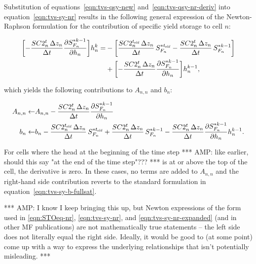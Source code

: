 \noindent Substitution of equations~\ref{eqn:tvs-qsy-new} and~\ref{eqn:tvs-qsy-nr-deriv} into equation~\ref{eqn:tvs-sy-nr} results in the following general expression of the Newton-Raphson formulation for the contribution of specific yield storage to cell $n$:

\begin{equation}
	\label{eqn:tvs-sy-nr-expanded}
	\begin{aligned}
		\biggl[ - \frac{SC2_n^t \, \Delta z_n}{\Delta t} \frac{\partial S_{F_n}^{\ast k-1}}{\partial h_n} \biggr] h_n^k =
		& - \biggl[ \frac{SC2_n^{t_\mathit{\kern -0.07em old}} \, \Delta z_n}{\Delta t} \, S_{F_n}^{\ast t_\mathit{\kern -0.07em old}} - \frac{SC2_n^t \, \Delta z_n}{\Delta t} \, S_{F_n}^{\ast k-1} \biggr] \\
		& + \biggl[ - \frac{SC2_n^t \, \Delta z_n}{\Delta t} \frac{\partial S_{F_n}^{\ast k-1}}{\partial h_n} \biggr] h_n^{k-1} ,
	\end{aligned}
\end{equation}

\noindent which yields the following contributions to $A_{n,n}$ and $b_n$:

\begin{equation}
	\label{eqn:tvs-sy-Ab-std}
	\begin{aligned}
		A_{n,n} \leftarrow & A_{n,n} - \frac{SC2_n^t \, \Delta z_n}{\Delta t} \frac{\partial S_{F_n}^{\ast k-1}}{\partial h_n} \\
		b_n \leftarrow & b_n - \frac{SC2_n^{t_\mathit{\kern -0.07em old}} \, \Delta z_n}{\Delta t} \, S_{F_n}^{\ast t_\mathit{\kern -0.07em old}} + \frac{SC2_n^t \, \Delta z_n}{\Delta t} \, S_{F_n}^{\ast k-1} - \frac{SC2_n^t \, \Delta z_n}{\Delta t} \frac{\partial S_{F_n}^{\ast k-1}}{\partial h_n} h_n^{k-1} .
	\end{aligned}
\end{equation}

\noindent For cells where the head at the beginning of the time step {\color{red} *** AMP: like earlier, should this say "at the end of the time step"??? ***} is at or above the top of the cell, the derivative is zero. In these cases, no terms are added to $A_{n,n}$ and the right-hand side contribution reverts to the standard formulation in equation~\ref{eqn:tvs-sy-b-fullsat}.

{\color{red} *** AMP: I know I keep bringing this up, but Newton expressions of the form used in \ref{eqn:STOeq-nr}, \ref{eqn:tvs-sy-nr}, and \ref{eqn:tvs-sy-nr-expanded} (and in other MF publications) are not mathematically true statements -- the left side does not literally equal the right side. Ideally, it would be good to (at some point) come up with a way to express the underlying relationships that isn't potentially misleading. ***}
